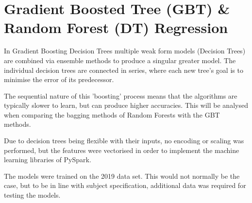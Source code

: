 \documentclass[11pt]{article}
\begin{document}
\begin{table}[h]
\caption{Post processing descriptive statistics of the features}
\label{tab:descriptive-statistics}
\end{table}



\section{Gradient Boosted Tree (GBT) \& Random Forest (DT) Regression}
In Gradient Boosting Decision Trees multiple weak form models (Decision Trees) are combined via ensemble methods to produce a singular greater model. The individual decision trees are connected in series, where each new tree's goal is to minimise the error of its predecessor. 

The sequential nature of this 'boosting' process means that the algorithms are typically slower to learn, but can produce higher accuracies. This will be analysed when comparing the bagging methods of Random Forests with the GBT methods.

Due to decision trees being flexible with their inputs, no encoding or scaling was performed, but the features were vectorised in order to implement the machine learning libraries of PySpark\cite{pyspk}.

The models were trained on the 2019 data set. This would not normally be the case, but to be in line with subject specification, additional data was required for testing the models.
\end{document}
